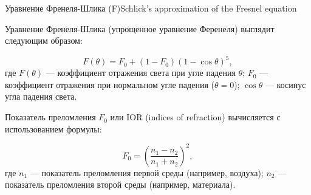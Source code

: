 \documentclass{beamer}
\begin{document}
	\begin{frame}{Уравнение Френеля-Шлика (F)}{Schlick's approximation of the Fresnel equation}
		

		Уравнение Френеля-Шлика (упрощенное уравнение Ференеля) выглядит следующим образом:
		
		\[ F(\theta) = F_0 + (1 - F_0)(1 - \cos \theta)^5 ,\]
		где
		\( F(\theta) \) --- коэффициент отражения света при угле падения \( \theta \);
		\( F_0 \) --- коэффициент отражения при нормальном угле падения (\( \theta = 0 \));
		\( \cos \theta \) --- косинус угла падения света.
		
		Показатель преломления $F_0$ или IOR (indices of refraction) вычисляется с использованием формулы:
		
		\[ F_0 = \left(\frac{n_1 - n_2}{n_1 + n_2}\right)^2 ,\]
		где
		\( n_1 \) --- показатель преломления первой среды (например, воздуха);
		\( n_2 \) --- показатель преломления второй среды (например, материала).
		
		
			\end{frame}
\end{document}
